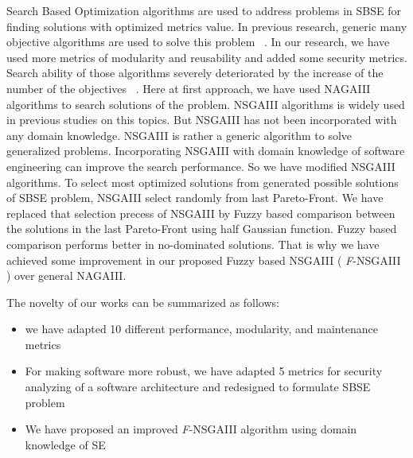 \documentclass[letterpaper, 10 pt, conference]{ieeeconf}  %
\begin{document}
Search Based Optimization algorithms are used to address problems in SBSE for finding solutions with optimized metrics value. In previous research, generic many objective algorithms are used to solve this problem ~\cite{ramirez2015approach}. In our research, we have used more metrics of modularity and reusability and added some security metrics. Search ability of those algorithms severely deteriorated by the increase of the number of the objectives ~\cite{ishibuchi2008evolutionary}.  Here at first approach, we have used NAGAIII~\cite{deb2014evolutionary} algorithms to search solutions of the problem. NSGAIII algorithms is widely used in previous studies on this topics. But NSGAIII has not been incorporated with any domain knowledge. NSGAIII is rather a generic algorithm to solve generalized problems. Incorporating NSGAIII with domain knowledge of software engineering can improve the search performance. So we have modified NSGAIII algorithms. To select most optimized solutions from generated possible solutions of SBSE problem, NSGAIII select randomly from last Pareto-Front. We have replaced that selection precess of NSGAIII by Fuzzy based comparison between the solutions in the last Pareto-Front using half Gaussian function. Fuzzy based comparison performs better in no-dominated solutions. That is why we have achieved some improvement in our proposed Fuzzy based NSGAIII ( \textit{F}-NSGAIII ) over general NAGAIII.  

The novelty of our works can be summarized as follows:

\begin{itemize}
\item we have adapted 10 different performance, modularity, and maintenance metrics 
\item For making software more robust, we have adapted 5 metrics for security analyzing of a software architecture and redesigned to formulate SBSE problem
\item We have proposed an improved \textit{F}-NSGAIII algorithm using domain knowledge of SE
\end{itemize}
\end{document}
